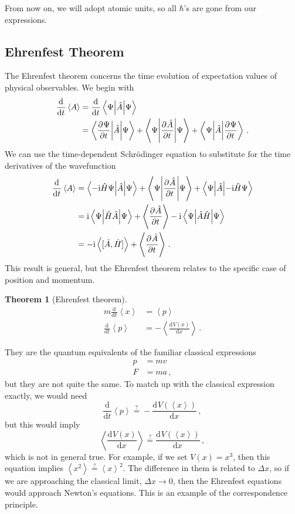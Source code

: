 \documentclass{article}
\theoremstyle{plain}\theoremheaderfont{\normalfont\itshape}\theorembodyfont{\rmfamily}\theoremseparator{.}\newtheorem*{rem}{Remark}\newtheorem*{ex}{Example}\newtheorem*{proof}{Proof}\newtheorem*{altp}{Alternative proof}
\theoremstyle{plain}\theoremheaderfont{\normalfont\bfseries}\theorembodyfont{\rmfamily}\theoremseparator{.}\newtheorem{thm}{Theorem}[section]\newtheorem{lem}[thm]{Lemma}\newtheorem{prop}[thm]{Proposition}\newtheorem*{cor}{Corollary}\newtheorem{defn}[thm]{Definition}\newtheorem{clm}[thm]{Claim}\newtheorem{clminproof}{Claim}
\theoremstyle{break}\theoremheaderfont{\normalfont\itshape}\theorembodyfont{\rmfamily}\theoremseparator{.\medskip}\newtheorem*{proofskip}{Proof}\newtheorem*{exs}{Examples}\newtheorem*{rems}{Remarks}
\theoremstyle{break}\theoremheaderfont{\normalfont\bfseries}\theorembodyfont{\rmfamily}\theoremseparator{.\medskip}\newtheorem{lemskip}[thm]{Lemma}\newtheorem{defnskip}[thm]{Definition}\newtheorem{propskip}[thm]{Proposition}\newtheorem{thmskip}[thm]{Theorem}
\numberwithin{equation}{section}
\newcommand{\ii}{\mathrm{i}}
\newcommand{\dv}[3][]{\frac{\mathrm{d}^{#1} #2}{{\mathrm{d} #3}^{#1}}}
\newcommand{\pdv}[3][]{\frac{\partial^{#1} #2}{{\partial #3}^{#1}}}
\newcommand{\mel}[3]{\left\langle #1 \middle| #2 \middle| #3 \right\rangle}
\newcommand{\eval}[1]{\left\langle #1 \right\rangle}
\newcommand{\expval}[2]{\left\langle #2 \middle| #1 \middle| #2 \right\rangle}
\begin{document}
    From now on, we will adopt atomic units, so all \(\hbar\)'s are gone from our expressions.
    
    \subsection{Ehrenfest Theorem}
    The Ehrenfest theorem concerns the time evolution of expectation values of physical observables. We begin with
    \begin{align}
        \dv{}{t}\eval{A}&=\dv{}{t}\expval{\hat{A}}{\Psi}\notag\\
        &=\mel{\pdv{\Psi}{t}}{\hat{A}}{\Psi}+\expval{\pdv{\hat{A}}{t}}{\Psi}+\mel{\Psi}{\hat{A}}{\pdv{\Psi}{t}}\,.
    \end{align}
    We can use the time-dependent Schr\"{o}dinger equation to substitute for the time derivatives of the wavefunction
    \begin{align}
        \dv{}{t}\eval{A}&=\mel{-\ii\hat{H}\Psi}{\hat{A}}{\Psi}+\expval{\pdv{\hat{A}}{t}}{\Psi}+\mel{\Psi}{\hat{A}}{-\ii\hat{H}\Psi}\notag \\
        &=\ii\expval{\hat{H}\hat{A}}{\Psi}+\eval{\pdv{\hat{A}}{t}}-\ii\expval{\hat{A}\hat{H}}{\Psi}\notag \\
        &=-\ii\eval{[\hat{A},\hat{H}]}+\eval{\pdv{\hat{A}}{t}}\,.
    \end{align}
    This result is general, but the Ehrenfest theorem relates to the specific case of position and momentum.
    \begin{thm}[Ehrenfest theorem]
        \begin{align}
            m\dv{}{t}\eval{x}&=\eval{p}\\
            \dv{}{t}\eval{p}&=-\eval{\dv{V(x)}{x}}\,.
        \end{align}
    \end{thm}
    They are the quantum equivalents of the familiar classical expressions
    \begin{align}
        p&=mv \\
        F&=ma\,,
    \end{align}
    but they are not quite the same. To match up with the classical expression exactly, we would need
    \begin{equation}
        \dv{}{t}\eval{p}\stackrel{?}{=}-\dv{V(\eval{x})}{x}\,,
    \end{equation}
    but this would imply
    \begin{equation}
        \eval{\dv{V(x)}{x}}\stackrel{?}{=}\dv{V(\eval{x})}{x}\,,
    \end{equation}
    which is not in general true. For example, if we set \(V(x)=x^3\), then this equation implies \(\eval{x^2}\stackrel{?}{=}\eval{x}^2\). The difference in them is related to \(\Delta x\), so if we are approaching the classical limit, \(\Delta x\to 0\), then the Ehrenfest equations would approach Newton's equations. This is an example of the correspondence principle.
\end{document}
